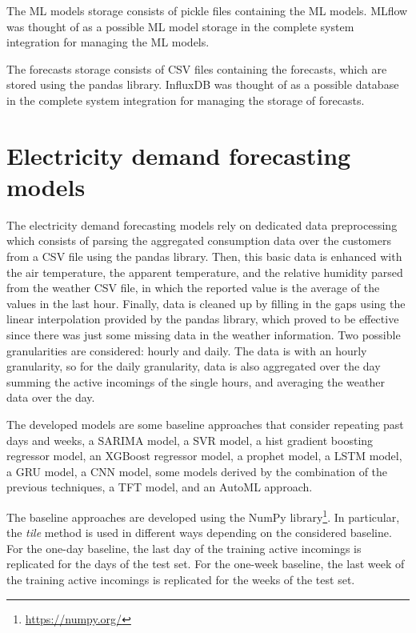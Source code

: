 The ML models storage consists of pickle files containing the ML models.
MLflow was thought of as a possible ML model storage in the complete system integration for managing the ML models.

The forecasts storage consists of CSV files containing the forecasts, which are stored using the pandas library.
InfluxDB was thought of as a possible database in the complete system integration for managing the storage of forecasts.


\section{Electricity demand forecasting models}
\label{sec:demandimpl}
\vspace{0.2 cm}

The electricity demand forecasting models rely on dedicated data preprocessing which consists of parsing the aggregated consumption data over the customers from a CSV file using the pandas library.
Then, this basic data is enhanced with the air temperature, the apparent temperature, and the relative humidity parsed from the weather CSV file, in which the reported value is the average of the values in the last hour.
Finally, data is cleaned up by filling in the gaps using the linear interpolation provided by the pandas library, which proved to be effective since there was just some missing data in the weather information.
Two possible granularities are considered: hourly and daily.
The data is with an hourly granularity, so for the daily granularity, data is also aggregated over the day summing the active incomings of the single hours, and averaging the weather data over the day.

The developed models are some baseline approaches that consider repeating past days and weeks, a SARIMA model, a SVR model, a hist gradient boosting regressor model, an XGBoost regressor model, a prophet model, a LSTM model, a GRU model, a CNN model, some models derived by the combination of the previous techniques, a TFT model, and an AutoML approach.

The baseline approaches are developed using the NumPy library\footnote{ \url{https://numpy.org/} }.
In particular, the \emph{tile} method is used in different ways depending on the considered baseline.
For the one-day baseline, the last day of the training active incomings is replicated for the days of the test set.
For the one-week baseline, the last week of the training active incomings is replicated for the weeks of the test set.

